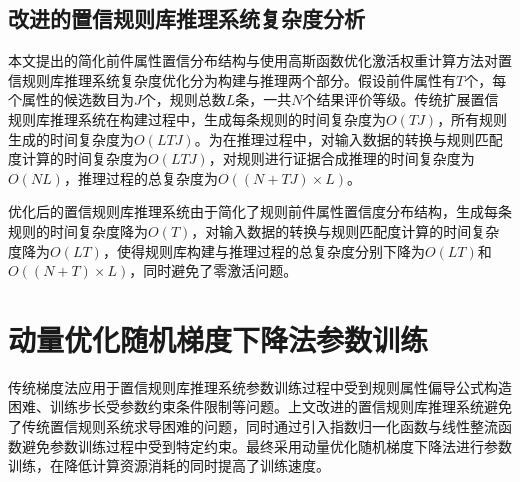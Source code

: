 \documentclass{cjc}
\begin{document}
\subsection{改进的置信规则库推理系统复杂度分析}
本文提出的简化前件属性置信分布结构与使用高斯函数优化激活权重计算方法对置信规则库推理系统复杂度优化分为构建与推理两个部分。假设前件属性有$T$个，每个属性的候选数目为$J$个，规则总数$L$条，一共$N$个结果评价等级。传统扩展置信规则库推理系统在构建过程中，生成每条规则的时间复杂度为$O(TJ)$，所有规则生成的时间复杂度为$O(LTJ)$。为在推理过程中，对输入数据的转换与规则匹配度计算的时间复杂度为$O(LTJ)$，对规则进行证据合成推理的时间复杂度为$O(NL)$，推理过程的总复杂度为$O((N+TJ)\times L)$。

优化后的置信规则库推理系统由于简化了规则前件属性置信度分布结构，生成每条规则的时间复杂度降为$O(T)$，对输入数据的转换与规则匹配度计算的时间复杂度降为$O(LT)$，使得规则库构建与推理过程的总复杂度分别下降为$O(LT)$和$O((N+T)\times L)$，同时避免了零激活问题。
\section{动量优化随机梯度下降法参数训练}
传统梯度法应用于置信规则库推理系统参数训练过程中受到规则属性偏导公式构造困难、训练步长受参数约束条件限制等问题。上文改进的置信规则库推理系统避免了传统置信规则系统求导困难的问题，同时通过引入指数归一化函数与线性整流函数避免参数训练过程中受到特定约束。最终采用动量优化随机梯度下降法进行参数训练，在降低计算资源消耗的同时提高了训练速度。
\end{document}
